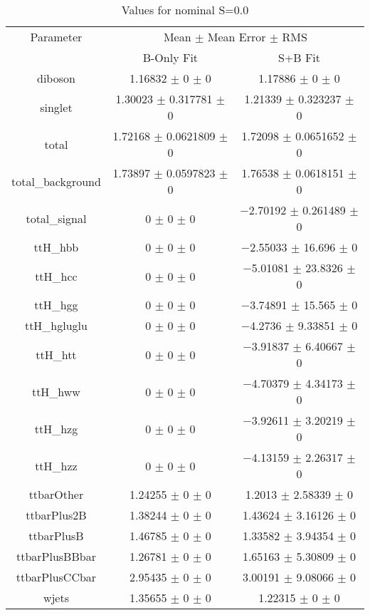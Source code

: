 \begin{table}
\centering
\caption{Values for nominal S=0.0}
\begin{tabular}{ccc}
\toprule
Parameter & \multicolumn{2}{c}{Mean $\pm$ Mean Error $\pm$ RMS}\\
 & B-Only Fit & S+B Fit\\
\midrule
diboson & \num{1.16832} $\pm$ \num{0} $\pm$ \num{0} & \num{1.17886} $\pm$ \num{0} $\pm$ \num{0}\\
singlet & \num{1.30023} $\pm$ \num{0.317781} $\pm$ \num{0} & \num{1.21339} $\pm$ \num{0.323237} $\pm$ \num{0}\\
total & \num{1.72168} $\pm$ \num{0.0621809} $\pm$ \num{0} & \num{1.72098} $\pm$ \num{0.0651652} $\pm$ \num{0}\\
total\_background & \num{1.73897} $\pm$ \num{0.0597823} $\pm$ \num{0} & \num{1.76538} $\pm$ \num{0.0618151} $\pm$ \num{0}\\
total\_signal & \num{0} $\pm$ \num{0} $\pm$ \num{0} & \num{-2.70192} $\pm$ \num{0.261489} $\pm$ \num{0}\\
ttH\_hbb & \num{0} $\pm$ \num{0} $\pm$ \num{0} & \num{-2.55033} $\pm$ \num{16.696} $\pm$ \num{0}\\
ttH\_hcc & \num{0} $\pm$ \num{0} $\pm$ \num{0} & \num{-5.01081} $\pm$ \num{23.8326} $\pm$ \num{0}\\
ttH\_hgg & \num{0} $\pm$ \num{0} $\pm$ \num{0} & \num{-3.74891} $\pm$ \num{15.565} $\pm$ \num{0}\\
ttH\_hgluglu & \num{0} $\pm$ \num{0} $\pm$ \num{0} & \num{-4.2736} $\pm$ \num{9.33851} $\pm$ \num{0}\\
ttH\_htt & \num{0} $\pm$ \num{0} $\pm$ \num{0} & \num{-3.91837} $\pm$ \num{6.40667} $\pm$ \num{0}\\
ttH\_hww & \num{0} $\pm$ \num{0} $\pm$ \num{0} & \num{-4.70379} $\pm$ \num{4.34173} $\pm$ \num{0}\\
ttH\_hzg & \num{0} $\pm$ \num{0} $\pm$ \num{0} & \num{-3.92611} $\pm$ \num{3.20219} $\pm$ \num{0}\\
ttH\_hzz & \num{0} $\pm$ \num{0} $\pm$ \num{0} & \num{-4.13159} $\pm$ \num{2.26317} $\pm$ \num{0}\\
ttbarOther & \num{1.24255} $\pm$ \num{0} $\pm$ \num{0} & \num{1.2013} $\pm$ \num{2.58339} $\pm$ \num{0}\\
ttbarPlus2B & \num{1.38244} $\pm$ \num{0} $\pm$ \num{0} & \num{1.43624} $\pm$ \num{3.16126} $\pm$ \num{0}\\
ttbarPlusB & \num{1.46785} $\pm$ \num{0} $\pm$ \num{0} & \num{1.33582} $\pm$ \num{3.94354} $\pm$ \num{0}\\
ttbarPlusBBbar & \num{1.26781} $\pm$ \num{0} $\pm$ \num{0} & \num{1.65163} $\pm$ \num{5.30809} $\pm$ \num{0}\\
ttbarPlusCCbar & \num{2.95435} $\pm$ \num{0} $\pm$ \num{0} & \num{3.00191} $\pm$ \num{9.08066} $\pm$ \num{0}\\
wjets & \num{1.35655} $\pm$ \num{0} $\pm$ \num{0} & \num{1.22315} $\pm$ \num{0} $\pm$ \num{0}\\
\bottomrule
\end{tabular}
\end{table}
